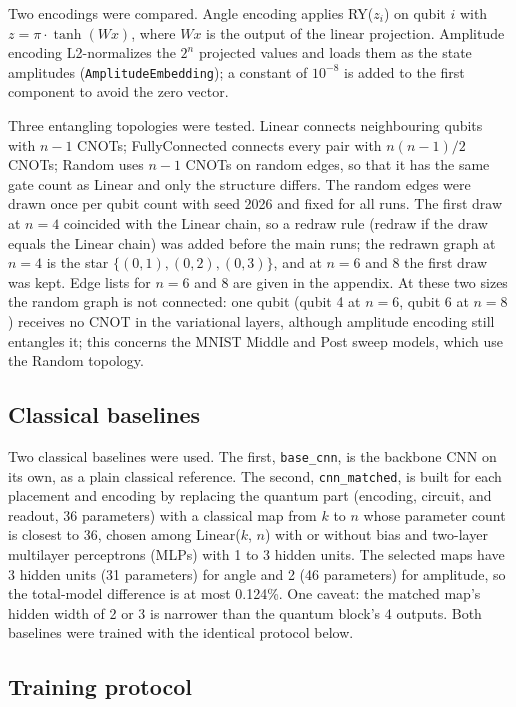 \documentclass{ieeeaccess}
\begin{document}
Two encodings were compared. Angle encoding applies RY($z_i$) on qubit $i$ with $z = \pi\cdot\tanh(Wx)$, where $Wx$ is the output of the linear projection. Amplitude encoding L2-normalizes the $2^n$ projected values and loads them as the state amplitudes (\texttt{AmplitudeEmbedding}); a constant of $10^{-8}$ is added to the first component to avoid the zero vector.

Three entangling topologies were tested. Linear connects neighbouring qubits with $n-1$ CNOTs; FullyConnected connects every pair with $n(n-1)/2$ CNOTs; Random uses $n-1$ CNOTs on random edges, so that it has the same gate count as Linear and only the structure differs. The random edges were drawn once per qubit count with seed 2026 and fixed for all runs. The first draw at $n = 4$ coincided with the Linear chain, so a redraw rule (redraw if the draw equals the Linear chain) was added before the main runs; the redrawn graph at $n = 4$ is the star $\{(0,1), (0,2), (0,3)\}$, and at $n = 6$ and 8 the first draw was kept. Edge lists for $n = 6$ and 8 are given in the appendix. At these two sizes the random graph is not connected: one qubit (qubit 4 at $n = 6$, qubit 6 at $n = 8$) receives no CNOT in the variational layers, although amplitude encoding still entangles it; this concerns the MNIST Middle and Post sweep models, which use the Random topology.

\subsection{Classical baselines}
\label{sec:design-baselines}

Two classical baselines were used. The first, \texttt{base\_cnn}, is the backbone CNN on its own, as a plain classical reference. The second, \texttt{cnn\_matched}, is built for each placement and encoding by replacing the quantum part (encoding, circuit, and readout, 36 parameters) with a classical map from $k$ to $n$ whose parameter count is closest to 36, chosen among Linear($k$, $n$) with or without bias and two-layer multilayer perceptrons (MLPs) with 1 to 3 hidden units. The selected maps have 3 hidden units (31 parameters) for angle and 2 (46 parameters) for amplitude, so the total-model difference is at most 0.124\%. One caveat: the matched map's hidden width of 2 or 3 is narrower than the quantum block's 4 outputs. Both baselines were trained with the identical protocol below.

\subsection{Training protocol}
\label{sec:design-training}
\end{document}
